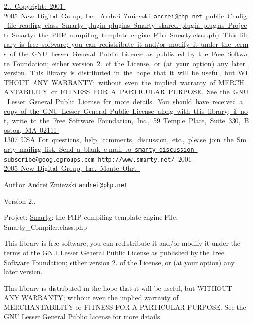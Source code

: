 \mbox{\hyperlink{}{2..  Copyright\+: 2001-\/2005 New Digital Group, Inc.  Andrei Zmievski \href{mailto:andrei@php.net}{\tt andrei@php.\+net}  public Config file reading class Smarty plugin  plugins Smarty shared plugin  plugins Project\+: Smarty\+: the P\+HP compiling template engine File\+: Smarty.\+class.\+php This library is free software; you can redistribute it and/or modify it under the terms of the G\+NU Lesser General Public License as published by the Free Software Foundation; either version 2. of the License, or (at your option) any later version. This library is distributed in the hope that it will be useful, but W\+I\+T\+H\+O\+UT A\+NY W\+A\+R\+R\+A\+N\+TY; without even the implied warranty of M\+E\+R\+C\+H\+A\+N\+T\+A\+B\+I\+L\+I\+TY or F\+I\+T\+N\+E\+SS F\+OR A P\+A\+R\+T\+I\+C\+U\+L\+AR P\+U\+R\+P\+O\+SE. See the G\+NU Lesser General Public License for more details. You should have received a copy of the G\+NU Lesser General Public License along with this library; if not, write to the Free Software Foundation, Inc., 59 Temple Place, Suite 330, Boston, MA 02111-\/1307 U\+SA For questions, help, comments, discussion, etc., please join the Smarty mailing list. Send a blank e-\/mail to \href{mailto:smarty-discussion-subscribe@googlegroups.com}{\tt smarty-\/discussion-\/subscribe@googlegroups.\+com}  \href{http://www.smarty.net/}{\tt http\+://www.\+smarty.\+net/}  2001-\/2005 New Digital Group, Inc.  Monte Ohrt }} \begin{DoxyAuthor}{Author}
Andrei Zmievski \href{mailto:andrei@php.net}{\tt andrei@php.\+net}
\end{DoxyAuthor}
\begin{DoxyVersion}{Version}
2..
\end{DoxyVersion}
Project\+: \mbox{\hyperlink{class_smarty}{Smarty}}\+: the P\+HP compiling template engine File\+: Smarty\+\_\+\+Compiler.\+class.\+php

This library is free software; you can redistribute it and/or modify it under the terms of the G\+NU Lesser General Public License as published by the Free Software \mbox{\hyperlink{namespace_foundation}{Foundation}}; either version 2. of the License, or (at your option) any later version.

This library is distributed in the hope that it will be useful, but W\+I\+T\+H\+O\+UT A\+NY W\+A\+R\+R\+A\+N\+TY; without even the implied warranty of M\+E\+R\+C\+H\+A\+N\+T\+A\+B\+I\+L\+I\+TY or F\+I\+T\+N\+E\+SS F\+OR A P\+A\+R\+T\+I\+C\+U\+L\+AR P\+U\+R\+P\+O\+SE. See the G\+NU Lesser General Public License for more details.

